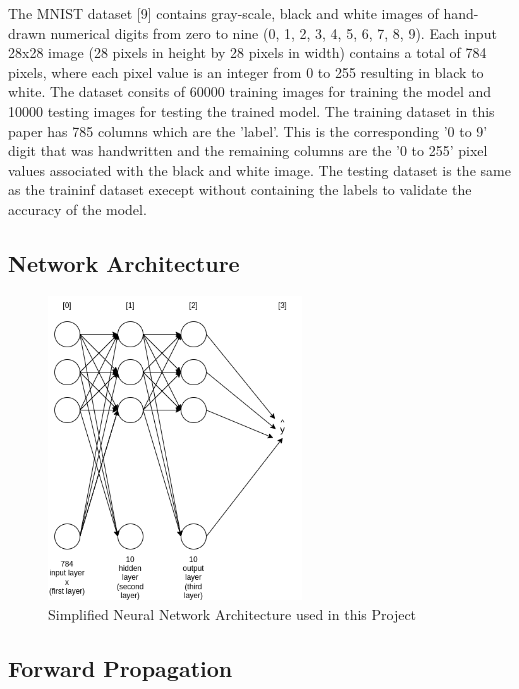 \documentclass[11pt]{article}
\begin{document}
The MNIST dataset [9] contains gray-scale, black and white images of hand-drawn numerical digits from zero to nine (0, 1, 2, 3, 4, 5, 6, 7, 8, 9). Each input 28x28 image (28 pixels in height by 28 pixels in width) contains a total of 784 pixels, where each pixel value is an integer from 0 to 255 resulting in black to white. The dataset consits of 60000 training images for training the model and 10000 testing images for testing the trained model. The training dataset in this paper has 785 columns which are the 'label'. This is the corresponding '0 to 9' digit that was handwritten and the remaining columns are the '0 to 255' pixel values associated with the black and white image. The testing dataset is the same as the traininf dataset execept without containing the labels to validate the accuracy of the model.


\subsection{Network Architecture}
\begin{figure}[H]
  \centering
  \includegraphics[width=0.6\textwidth]{Neural Network.drawio.png}
  \caption{Simplified Neural Network Architecture used in this Project}
  \label{fig:mnist}
\end{figure}

\subsection{Forward Propagation}
\end{document}
